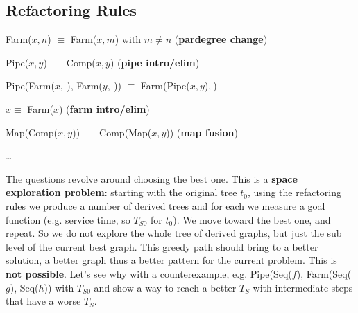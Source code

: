\documentclass[10pt]{report}
\begin{document}
\subsection{Refactoring Rules}
\begin{list}{}{}
	\item Farm($x, n$) $\equiv$ Farm($x, m$) with $m\neq n$ (\textbf{pardegree change})
	\item Pipe($x, y$) $\equiv$ Comp($x, y$) (\textbf{pipe intro/elim})
	\item Pipe(Farm($x, \:$), Farm($y, \:$)) $\equiv$ Farm(Pipe($x, y$),$\:$)
	\item $x \equiv$ Farm($x$) (\textbf{farm intro/elim})
	\item Map(Comp($x, y$)) $\equiv$ Comp(Map($x,y$)) (\textbf{map fusion})
	\item \ldots
\end{list}
The questions revolve around choosing the best one. This is a \textbf{space exploration problem}: starting with the original tree $t_0$, using the refactoring rules we produce a number of derived trees and for each we measure a goal function (e.g. service time, so $T_{S0}$ for $t_0$). We move toward the best one, and repeat. So we do not explore the whole tree of derived graphs, but just the sub level of the current best graph. This greedy path should bring to a better solution, a better graph thus a better pattern for the current problem. This is \textbf{not possible}. Let's see why with a counterexample, e.g. Pipe(Seq($f$), Farm(Seq($g$), Seq($h$)) with $T_{S0}$ and show a way to reach a better $T_S$ with intermediate steps that have a worse $T_S$.
\end{document}
